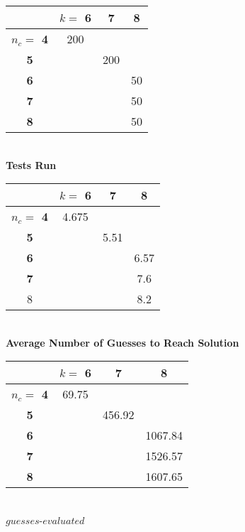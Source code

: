 \documentclass[11pt,twocolumn]{article}
\begin{document}
\begin{center}
\begin{tabular}{|c|c|c|c|}
\hline
        &\bf $k= $ 6 &\bf 7 &\bf 8 \\
\hline
\bf $n_c = $ 4 & 200   &   &   \\
\hline
\bf 5       &       &200&   \\
\hline
\bf 6       &       &   &50 \\
\hline
\bf 7       &       &   &50 \\
\hline
\bf 8       &       &   &50 \\
\hline
\end{tabular}\\
\bf Tests Run\rm\\
\end{center}


\begin{center}
\begin{tabular}{|c|c|c|c|}
\hline
        &\bf  $k= $ 6 &\bf 7 &\bf 8 \\
\hline
\bf $n_c = $ 4 & 4.675  &   &   \\
\hline
\bf 5       &       &5.51&   \\
\hline
\bf 6       &       &   &6.57 \\
\hline
\bf 7       &       &   &7.6 \\
\hline
8       &       &   &8.2 \\
\hline
\end{tabular}\\
\bf Average Number of Guesses to Reach Solution \rm\\
\vspace{.7cm}

\begin{tabular}{|c|c|c|c|}
\hline
        &\bf $k= $ 6 &\bf 7 &\bf 8 \\
\hline
\bf $n_c = $ 4 & 69.75   &   &   \\
\hline
\bf 5       &       & 456.92  &   \\
\hline
\bf 6       &       &   & 1067.84 \\
\hline
\bf 7       &       &   &1526.57 \\
\hline
\bf 8       &       &   &1607.65 \\
\hline
\end{tabular}\\
$guesses$-$evaluated$
\end{center}
\end{document}
